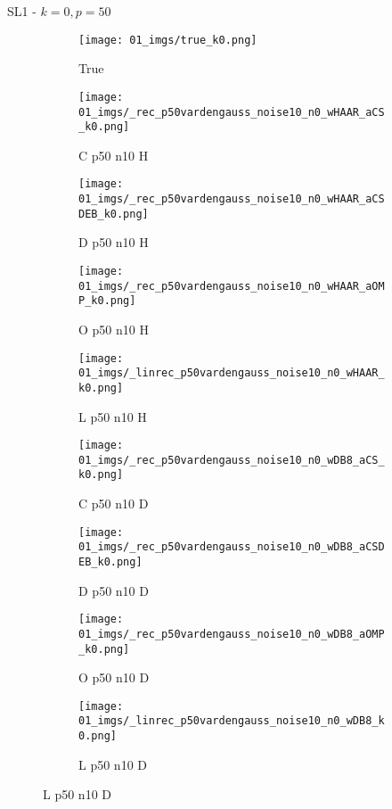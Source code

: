 \begin{frame}{SL1 - $k=0,p=50$}{}
\begin{figure}
\begin{subfigure}{0.1\textwidth}
\texttt{[image: 01\_imgs/true\_k0.png]}
\caption*{\Tiny True}
\end{subfigure}
\begin{subfigure}{0.1\textwidth}
\texttt{[image: 01\_imgs/\_rec\_p50vardengauss\_noise10\_n0\_wHAAR\_aCS\_k0.png]}
\caption*{\Tiny C p50 n10 H}
\end{subfigure}
\begin{subfigure}{0.1\textwidth}
\texttt{[image: 01\_imgs/\_rec\_p50vardengauss\_noise10\_n0\_wHAAR\_aCSDEB\_k0.png]}
\caption*{\Tiny D p50 n10 H}
\end{subfigure}
\begin{subfigure}{0.1\textwidth}
\texttt{[image: 01\_imgs/\_rec\_p50vardengauss\_noise10\_n0\_wHAAR\_aOMP\_k0.png]}
\caption*{\Tiny O p50 n10 H}
\end{subfigure}
\begin{subfigure}{0.1\textwidth}
\texttt{[image: 01\_imgs/\_linrec\_p50vardengauss\_noise10\_n0\_wHAAR\_k0.png]}
\caption*{\Tiny L p50 n10 H}
\end{subfigure}
\begin{subfigure}{0.1\textwidth}
\texttt{[image: 01\_imgs/\_rec\_p50vardengauss\_noise10\_n0\_wDB8\_aCS\_k0.png]}
\caption*{\Tiny C p50 n10 D}
\end{subfigure}
\begin{subfigure}{0.1\textwidth}
\texttt{[image: 01\_imgs/\_rec\_p50vardengauss\_noise10\_n0\_wDB8\_aCSDEB\_k0.png]}
\caption*{\Tiny D p50 n10 D}
\end{subfigure}
\begin{subfigure}{0.1\textwidth}
\texttt{[image: 01\_imgs/\_rec\_p50vardengauss\_noise10\_n0\_wDB8\_aOMP\_k0.png]}
\caption*{\Tiny O p50 n10 D}
\end{subfigure}
\begin{subfigure}{0.1\textwidth}
\texttt{[image: 01\_imgs/\_linrec\_p50vardengauss\_noise10\_n0\_wDB8\_k0.png]}
\caption*{\Tiny L p50 n10 D}
\end{subfigure}

\vspace{5pt}


\end{figure}
\end{frame}
